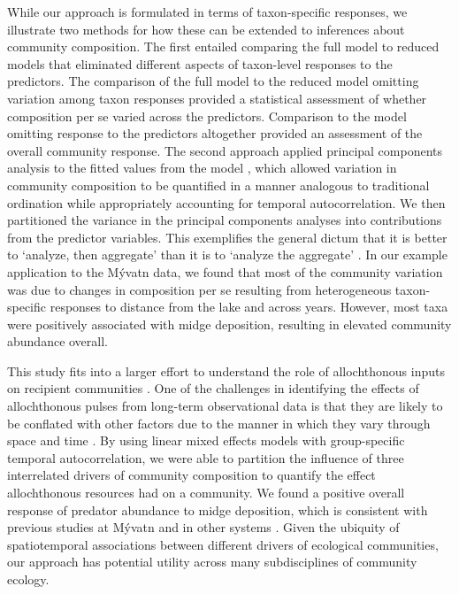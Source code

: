 While our approach is formulated in terms of taxon-specific responses,
we illustrate two methods for how these can be extended to inferences about community composition.
The first entailed comparing the full model to reduced models that eliminated different aspects of 
taxon-level responses to the predictors.
The comparison of the full model to the reduced model omitting variation among taxon responses provided a statistical
assessment of whether composition per se varied across the predictors.
Comparison to the model omitting response to the predictors altogether provided an assessment of the overall community response.
The second approach applied principal components analysis to the fitted values from the model \citep[similar to][]{Jackson2012}, 
which allowed variation in community composition to be quantified in a manner analogous to traditional ordination
while appropriately accounting for temporal autocorrelation. 
We then partitioned the variance in the principal components analyses into contributions from the predictor variables.
This exemplifies the general dictum that it is better to `analyze, then aggregate' than it
is to `analyze the aggregate' \citep{Clark2011}.
In our example application to the M\'{y}vatn data,
we found that most of the community variation was due to changes in composition per se
resulting from heterogeneous taxon-specific responses to distance from the lake and across years.
However, most taxa were positively associated with midge deposition,
resulting in elevated community abundance overall.



This study fits into a larger effort to understand the role 
of allochthonous inputs on recipient communities \citep{Polis1997}.
One of the challenges in identifying the effects of allochthonous pulses 
from long-term observational data is that they are likely to be conflated
with other factors due to the manner in which they vary through space and time \citep{Yang2008}.
By using linear mixed effects models with group-specific temporal autocorrelation, 
we were able to partition the influence of three interrelated drivers of community composition 
to quantify the effect allochthonous resources had on a community.
We found a positive overall response of predator abundance to midge deposition, which
is consistent with previous studies at M\'{y}vatn \citep{Dreyer2012, Hoekman2011, Sanchez2018}
and in other systems \citep{Murphy2012, Ostfeld2000}.
Given the ubiquity of spatiotemporal associations between different drivers of ecological communities, 
our approach has potential utility across many subdisciplines of community ecology.

